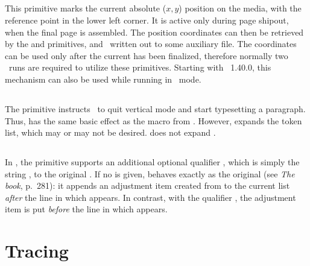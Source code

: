 \documentclass{pdftexmanual}
\begin{document}
\subsection{}

This primitive marks the current absolute ($x,y$) position on the media,
with the reference point in the lower left corner. It is active only
during page shipout, when the final page is assembled. The position
coordinates can then be retrieved by the  and
 primitives, and \eg\ written out to some auxiliary
file. The coordinates can be used only after the current 
has been finalized, therefore normally two \PDFTEX\ runs are required to
utilize these primitives. Starting with \PDFTEX\ 1.40.0, this mechanism
can also be used while running in \DVI\ mode.

\subsection{}

The primitive instructs \PDFTEX\ to quit vertical mode and start
typesetting a paragraph. Thus,  has the same basic effect
as the  macro from . However,
 expands the  token list, which may or may
not be desired.  does not expand .

\subsection{}

In \PDFTEX, the  primitive supports an additional optional
qualifier , which is simply the string ,
to the original \TEX. If no  is given,  behaves
exactly as the original (see {\em The \TEX book}, p.~281): it appends an
adjustment item created from  to the
current list {\em after} the line in which  appears. In
contrast, with the qualifier , the adjustment item is put {\em
before} the line in which  appears.

\section{Tracing}
\end{document}
